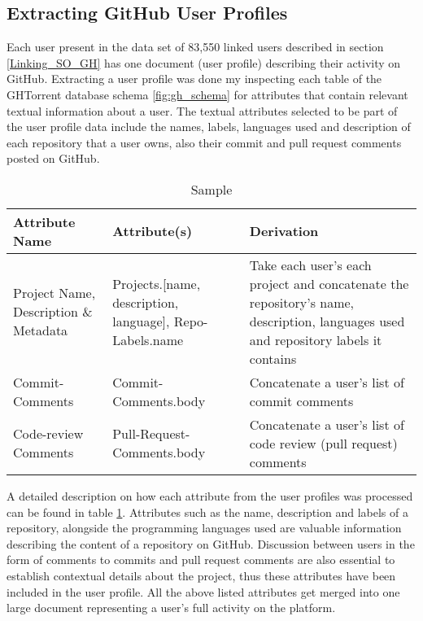     \subsection{Extracting GitHub User Profiles\label{GH_userProfileExtraction}}
    
        Each user present in the data set of 83,550 linked users described in section \ref{Linking_SO_GH} has one document (user profile) describing their activity on GitHub. Extracting a user profile was done my inspecting each table of the GHTorrent database schema \ref{fig:gh_schema} for attributes that contain relevant textual information about a user. The textual attributes selected to be part of the user profile data include the names, labels, languages used and description of each repository that a user owns, also their commit and pull request comments posted on GitHub. 
        
        \begin{table}[!htbp]
            \centering
            \caption{Sample}
            \label{tab:GH_userProfileExtraction}
            \vspace{6pt} %
            \begin{tabular}{|p{3.3cm}|p{3cm}|p{7.7cm}|}
               \toprule
               \textbf{Attribute Name} & \textbf{Attribute(s)} & \textbf{Derivation} \\
               \toprule
                Project Name, Description \& Metadata & Projects.[name, description, language], Repo-Labels.name & Take each user's each project and concatenate the repository's name, description, languages used and repository labels it contains\\  
                Commit-Comments & Commit-Comments.body & Concatenate a user's list of commit comments \\
                Code-review Comments & Pull-Request-Comments.body & Concatenate a user's list of code review (pull request) comments \\
               \bottomrule
            \end{tabular}
        \end{table}
        
        A detailed description on how each attribute from the user profiles was processed can be found in table \ref{tab:GH_userProfileExtraction}. Attributes such as the name, description and labels of a repository, alongside the programming languages used are valuable information describing the content of a repository on GitHub. Discussion between users in the form of comments to commits and pull request comments are also essential to establish contextual details about the project, thus these attributes have been included in the user profile. All the above listed attributes get merged into one large document representing a user's full activity on the platform. 
        
